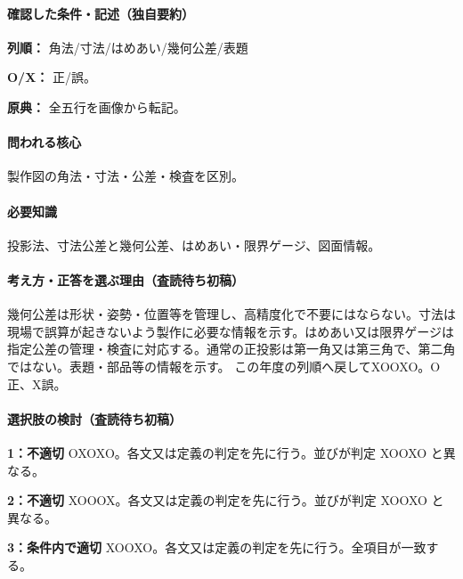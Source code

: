 \paragraph{確認した条件・記述（独自要約）}\mbox{}\par

\noindent\textbf{列順：} 角法/寸法/はめあい/幾何公差/表題\par

\noindent\textbf{O/X：} 正/誤。\par

\noindent\textbf{原典：} 全五行を画像から転記。\par

\paragraph{問われる核心} 製作図の角法・寸法・公差・検査を区別。

\paragraph{必要知識} 投影法、寸法公差と幾何公差、はめあい・限界ゲージ、図面情報。

\paragraph{考え方・正答を選ぶ理由（査読待ち初稿）} 幾何公差は形状・姿勢・位置等を管理し、高精度化で不要にはならない。寸法は現場で誤算が起きないよう製作に必要な情報を示す。はめあい又は限界ゲージは指定公差の管理・検査に対応する。通常の正投影は第一角又は第三角で、第二角ではない。表題・部品等の情報を示す。 この年度の列順へ戻してXOOXO。O正、X誤。

\paragraph{選択肢の検討（査読待ち初稿）}\mbox{}\par

\noindent\textbf{1：不適切} OXOXO。各文又は定義の判定を先に行う。並びが判定 XOOXO と異なる。\par

\noindent\textbf{2：不適切} XOOOX。各文又は定義の判定を先に行う。並びが判定 XOOXO と異なる。\par

\noindent\textbf{3：条件内で適切} XOOXO。各文又は定義の判定を先に行う。全項目が一致する。\par

